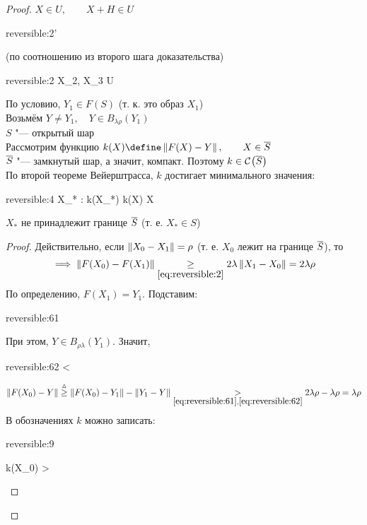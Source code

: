 \begin{proof}
	$ X \in U, \qquad X + H \in U $
	\begin{equ}{reversible:2'}
		 \lambda{}
	\end{equ}
	(по соотношению  из второго шага доказательства)
	\begin{equ}{reversible:2}
		 \iff {} \lambda{} \qquad \forall X_2, X_3 \in U
	\end{equ}
	По условию, $ Y_1 \in F(S) $ (т. к. это образ $ X_1 $) \\
	Возьмём $ Y \ne Y_1, \quad Y \in B_{\lambda\rho}(Y_1) $ \\
	$ S $ "--- открытый шар \\
	Рассмотрим функцию $ k(X) \define \norm{F(X) - Y}, \qquad X \in \ol{S} $ \\
	$ \overline{S} $ "--- замкнутый шар, а значит, компакт. Поэтому $ k \in \mathcal{C}^{} \big( {\overline{S}} \big)  $ \\
	По второй теореме Вейерштрасса, $ k $ достигает минимального значения:
	\begin{equ}{reversible:4}
		\exist X_* \in {} : k(X_*) \le k(X) \quad \forall X \in {}
	\end{equ}
	\begin{statement}
		$ X_* $ не принадлежит границе $ \overline{S} $ (т. е. $ X_* \in S $)
	\end{statement}
	\begin{proof}
		Действительно, если $ \left\|{X_0 - X_1}\right\| = \rho $ (т. е. $ X_0 $ лежит на границе $ \overline{S} $), то
		$$ \implies \norm{F(X_0) - F(X_1)} \underset{\eref{reversible:2}}\ge 2\lambda\norm{X_1 - X_0} = 2\lambda\rho $$
		По определению, $ F(X_1) = Y_1 $. Подставим:
		\begin{equ}{reversible:61}
			 \lambda\rho
		\end{equ}
		При этом, $ Y \in B_{\rho\lambda}(Y_1) $. Значит,
		\begin{equ}{reversible:62}
			 < \lambda\rho
		\end{equ}
		$$ \norm{F(X_0) - Y} \trige \norm{F(X_0) - Y_1} - \norm{Y_1 - Y} \underset{\eref{reversible:61}, \eref{reversible:62}}> 2\lambda\rho - \lambda\rho = \lambda\rho $$
		В обозначениях $ k $ можно записать:
		\begin{equ}{reversible:9}
			\begin{rcases}
				k(X_0)   > \lambda\rho \\

\end{rcases}
\end{equ}
\end{proof}
\end{proof}
